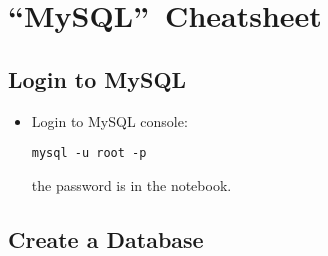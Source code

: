 \section{\textquotedblleft MySQL\textquotedblright\ Cheatsheet}

%

\subsection{Login to MySQL}

\begin{itemize}
    \item Login to MySQL console:
    \begin{verbatim}
mysql -u root -p
    \end{verbatim}
    the password is in the notebook.
\end{itemize}

\subsection{Create a Database}

